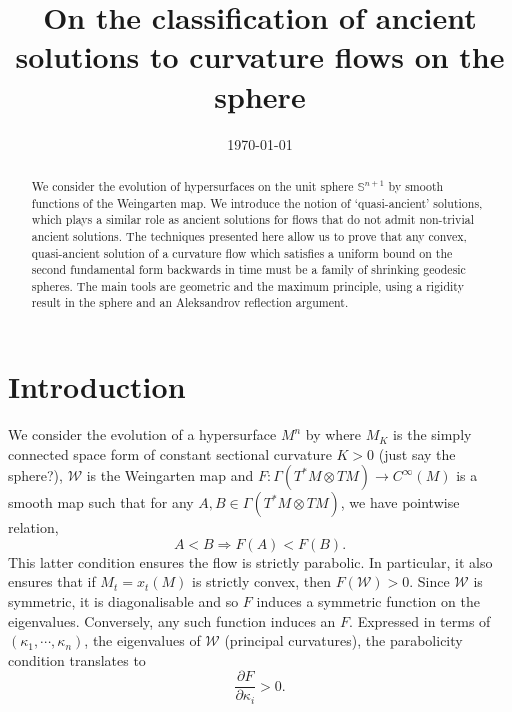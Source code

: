 \documentclass{amsart}
\begin{document}
\title[Ancient solutions to curvature flows in the sphere]
 {On the classification of ancient solutions to curvature flows on the sphere}

\curraddr{}
\email{}
\date{\today}

\dedicatory{}
\subjclass[2010]{}
\keywords{}

\begin{abstract}
We consider the evolution of hypersurfaces on the unit sphere $\mathbb{S}^{n+1}$ by smooth functions of the Weingarten map. We introduce the notion of `quasi-ancient' solutions, which plays a similar role as ancient solutions for flows that do not admit non-trivial ancient solutions. The techniques presented here allow us to prove that any convex, quasi-ancient solution of a curvature flow which satisfies a uniform bound on the second fundamental form backwards in time must be a family of shrinking geodesic spheres. The main tools are geometric and the maximum principle, using a rigidity result in the sphere and an Aleksandrov reflection argument.
\end{abstract}

\maketitle

\section{Introduction}
\label{sec:intro}

We consider the evolution of a hypersurface $M^n$ by
\eq{\label{eq:CurvFlow}
\partial_tx=-F(\mathcal{W})\nu,~ x:M^n\times[0,T)\to M_K,
}
where \(M_K\) is the simply connected space form of constant sectional curvature \(K>0\) (just say the sphere?), \(\mathcal{W}\) is the Weingarten map and \(F : \Gamma(T^\ast M \otimes TM) \to C^{\infty}(M)\) is a smooth map such that for any \(A, B \in \Gamma(T^\ast M \otimes TM)\), we have pointwise relation,
\[
A < B \Rightarrow F(A) < F(B).
\]
This latter condition ensures the flow is strictly parabolic. In particular, it also ensures that if \(M_t = x_t(M)\) is strictly convex, then \(F(\mathcal{W}) > 0.\) Since \(\mathcal{W}\) is symmetric, it is diagonalisable and so \(F\) induces a symmetric function on the eigenvalues. Conversely, any such function induces an \(F\). Expressed in terms of \((\kappa_1,\cdots,\kappa_n)\), the eigenvalues of \(\mathcal{W}\) (principal curvatures), the parabolicity condition translates to 
\[
\frac{\partial F}{\partial \kappa_i} > 0.
\]
\end{document}
